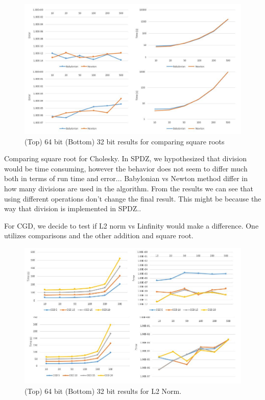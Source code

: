 \documentclass{article}
\theoremstyle{plain}
\theoremstyle{definition}
\theoremstyle{remark}
\begin{document}
\begin{figure}[h]
  \includegraphics[width=\linewidth]{sqrt.jpg}
  \caption{ (Top) 64 bit (Bottom) 32 bit results for comparing square roots}
  \label{fig:result1}
\end{figure}

Comparing square root for Cholesky. In SPDZ, we hypothesized that division would be time consuming, however the behavior does not seem to differ much both in terms of run time and error... Babylonian vs Newton method differ in how many divisions are used in the algorithm. From the results we can see that using different operations don't change the final result. This might be because the way that division is implemented in SPDZ.. 


For CGD, we decide to test if L2 norm vs Linfinity would make a difference. One utilizes comparisons and the other addition and square root. 
\begin{figure}[h]
  \includegraphics[width=\linewidth]{l2.jpg}
  \caption{ (Top) 64 bit (Bottom) 32 bit results for L2 Norm. }
  \label{fig:result1}
\end{figure}
\end{document}
